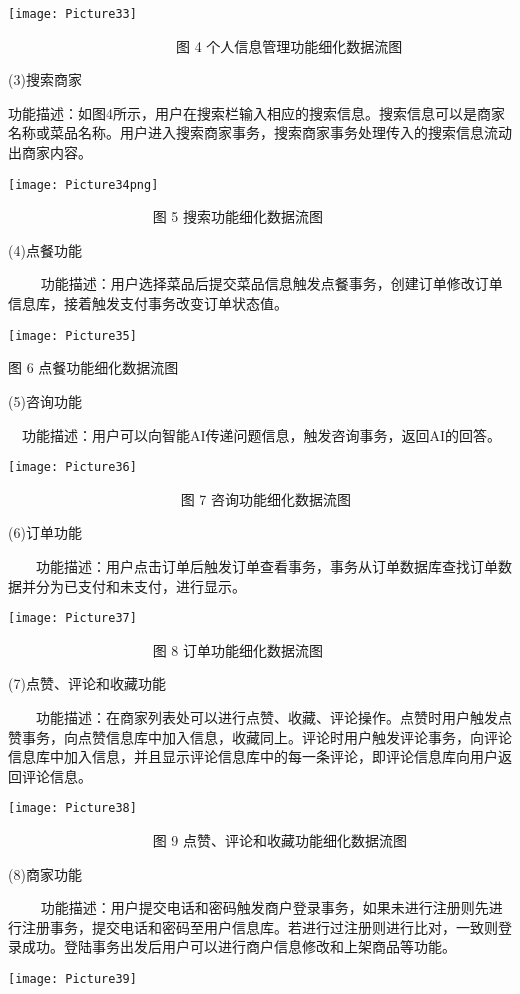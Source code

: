 \texttt{[image: Picture33]}

            图 4 个人信息管理功能细化数据流图

(3)搜索商家

​
功能描述：如图4所示，用户在搜索栏输入相应的搜索信息。搜索信息可以是商家名称或菜品名称。用户进入搜索商家事务，搜索商家事务处理传入的搜索信息流动出商家内容。

\texttt{[image: Picture34png]}

           图 5 搜索功能细化数据流图

(4)点餐功能

​  
功能描述：用户选择菜品后提交菜品信息触发点餐事务，创建订单修改订单信息库，接着触发支付事务改变订单状态值。

\texttt{[image: Picture35]}

图 6 点餐功能细化数据流图

(5)咨询功能

​  功能描述：用户可以向智能AI传递问题信息，触发咨询事务，返回AI的回答。

\texttt{[image: Picture36]}

             图 7 咨询功能细化数据流图

(6)订单功能

  功能描述：用户点击订单后触发订单查看事务，事务从订单数据库查找订单数据并分为已支付和未支付，进行显示。

\texttt{[image: Picture37]}

           图 8 订单功能细化数据流图

(7)点赞、评论和收藏功能

  功能描述：在商家列表处可以进行点赞、收藏、评论操作。点赞时用户触发点赞事务，向点赞信息库中加入信息，收藏同上。评论时用户触发评论事务，向评论信息库中加入信息，并且显示评论信息库中的每一条评论，即评论信息库向用户返回评论信息。

\texttt{[image: Picture38]}

           图 9 点赞、评论和收藏功能细化数据流图

(8)商家功能

​  
功能描述：用户提交电话和密码触发商户登录事务，如果未进行注册则先进行注册事务，提交电话和密码至用户信息库。若进行过注册则进行比对，一致则登录成功。登陆事务出发后用户可以进行商户信息修改和上架商品等功能。

\texttt{[image: Picture39]}

